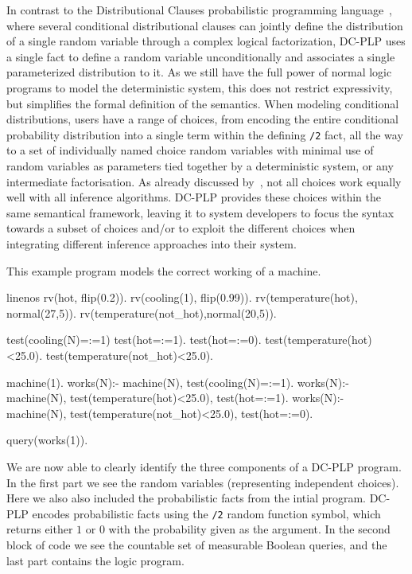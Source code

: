 In contrast to the Distributional Clauses probabilistic programming language~\citep{gutmann2011magic}, where several conditional distributional clauses can jointly define the distribution of a single random variable through a complex logical factorization, DC-PLP uses a single fact to define a random variable unconditionally and associates a single parameterized distribution to it. As we still have the full power of normal logic programs to model the deterministic system, this does not restrict expressivity, but simplifies the formal definition of the semantics. When modeling conditional distributions, users have a range of choices, from encoding the entire conditional probability distribution into a single term within the defining \lstinline[columns=fixed]|/2| fact, all the way to a set of individually named choice random variables with minimal use of random variables as parameters tied together by a deterministic system, or any intermediate factorisation.
As already discussed by~\citet{poole2010probabilistic}, not all choices work equally well with all inference algorithms.
DC-PLP provides these choices within the same semantical framework, leaving it to system developers to focus the syntax towards a subset of choices and/or to exploit the different choices when integrating different inference approaches into their system.


\begin{example} \label{ex:dcproblog_program_without_dc_plpdc}
	This example program models the correct working of a machine.
	
\begin{problog*}{linenos}
rv(hot, flip(0.2)). 
rv(cooling(1), flip(0.99)). 
rv(temperature(hot), normal(27,5)).
rv(temperature(not_hot),normal(20,5)).


test(cooling(N)=:=1)
test(hot=:=1).
test(hot=:=0).
test(temperature(hot)<25.0).
test(temperature(not_hot)<25.0).


machine(1).
works(N):- machine(N), test(cooling(N)=:=1).
works(N):-
	machine(N),
	test(temperature(hot)<25.0),
	test(hot=:=1). 
works(N):-
	machine(N),
	test(temperature(not_hot)<25.0),
	test(hot=:=0). 

query(works(1)).
\end{problog*}
	We are now able to clearly identify the three components of a DC-PLP program. In the first part we see the random variables (representing independent choices). Here we also also included the probabilistic facts from the intial \dcproblogsty program. DC-PLP encodes probabilistic facts using the \lstinline[columns=fixed]|/2| random function symbol, which returns either $1$ or $0$ with the probability given as the argument. In the second block of code we see the countable set of measurable Boolean queries, and the last part contains the logic program.
\end{example}

